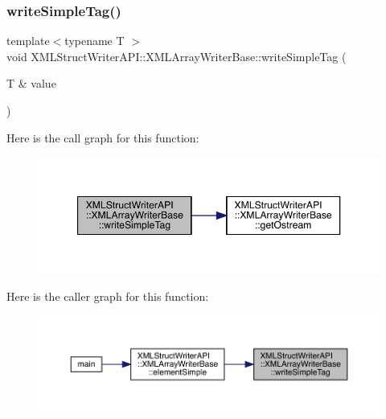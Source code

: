 \mbox{\label{classXMLStructWriterAPI_1_1XMLArrayWriterBase_a7c0092991561b5000ae55724cdc3d062}} 
\subsubsection{\texorpdfstring{writeSimpleTag()}{writeSimpleTag()}\hspace{0.1cm}{\footnotesize\ttfamily [1/3]}}
{\footnotesize\ttfamily template$<$typename T $>$ \\
void X\+M\+L\+Struct\+Writer\+A\+P\+I\+::\+X\+M\+L\+Array\+Writer\+Base\+::write\+Simple\+Tag (\begin{DoxyParamCaption}\item[{T \&}]{value }\end{DoxyParamCaption})\hspace{0.3cm}{\ttfamily [inline]}}

Here is the call graph for this function\+:
\nopagebreak
\begin{figure}[H]
\begin{center}
\leavevmode
\includegraphics[width=347pt]{d5/d41/classXMLStructWriterAPI_1_1XMLArrayWriterBase_a7c0092991561b5000ae55724cdc3d062_cgraph}
\end{center}
\end{figure}
Here is the caller graph for this function\+:
\nopagebreak
\begin{figure}[H]
\begin{center}
\leavevmode
\includegraphics[width=350pt]{d5/d41/classXMLStructWriterAPI_1_1XMLArrayWriterBase_a7c0092991561b5000ae55724cdc3d062_icgraph}
\end{center}
\end{figure}
\mbox{\label{classXMLStructWriterAPI_1_1XMLArrayWriterBase_a7c0092991561b5000ae55724cdc3d062}} 
